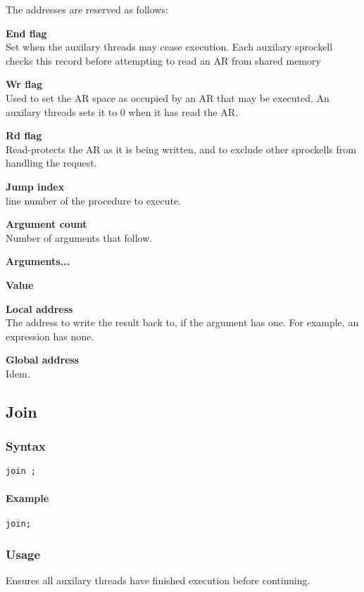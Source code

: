 \documentclass[twoside]{report}
\begin{document}
The addresses are reserved as follows:

\begin{compactitem}
	\item \textbf{End flag} \\ Set when the auxilary threads may cease execution. Each auxilary sprockell checks this record before attempting to read an AR from shared memory  
	\item \textbf{Wr flag} \\ Used to set the AR space as occupied by an AR that may be executed. An auxilary threads sets it to 0 when it has read the AR.
	\item \textbf{Rd flag} \\ Read-protects the AR as it is being written, and to exclude other sprockells from handling the request.
	\item \textbf{Jump index} \\ line number of the procedure to execute.
	\item \textbf{Argument count} \\ Number of arguments that follow.
	\item \textbf{Arguments...}
	\begin{compactitem}
		\item \textbf{Value}
		\item \textbf{Local address} \\ The address to write the result back to, if the argument has one. For example, an expression has none.
		\item \textbf{Global address} \\  Idem.
	\end{compactitem}
\end{compactitem}




\subsection{Join}
\label{def:join}
\subsubsection*{Syntax}
\texttt{join ;}
\paragraph{Example}
\begin{verbatim}
join;
\end{verbatim}
\subsubsection*{Usage}
Ensures all auxilary threads have finished execution before continuing. 
\end{document}

